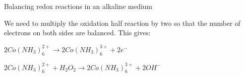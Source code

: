 \begin{wex}{Balancing redox reactions in an alkaline medium\\}
{We need to multiply the oxidation half reaction by two so that the number of electrons on both sides are balanced. This gives:

\begin{center}
\rm${2Co(NH_{3})_{6}^{2+} \rightarrow 2Co(NH_{3})_{6}^{3+} + 2e^{-}}$\\
\end{center}

\begin{center}
\rm${2Co(NH_{3})_{6}^{2+} + H_{2}O_{2} \rightarrow 2Co(NH_{3})_{6}^{3+} + 2OH^{-}}$\\
\end{center}
}
\end{wex}

